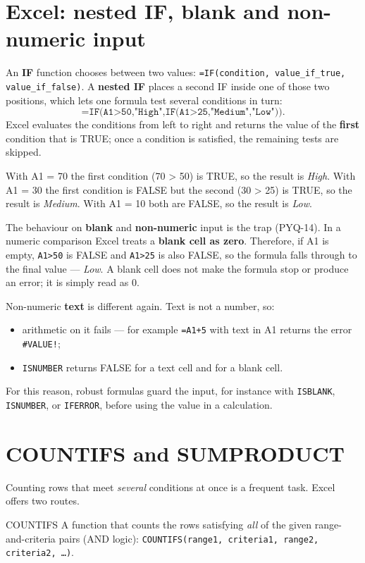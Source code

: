 \section{Excel: nested IF, blank and non-numeric input}
An \textbf{IF} function chooses between two values:
\texttt{=IF(condition, value\_if\_true, value\_if\_false)}. A \textbf{nested
IF} places a second IF inside one of those two positions, which lets one
formula test several conditions in turn:
\[
\texttt{=IF(A1>50,"High",IF(A1>25,"Medium","Low"))}.
\]
Excel evaluates the conditions from left to right and returns the value of the
\textbf{first} condition that is TRUE; once a condition is satisfied, the
remaining tests are skipped.

\begin{example}
With A1 = 70 the first condition (70 > 50) is TRUE, so the result is
\emph{High}. With A1 = 30 the first condition is FALSE but the second
(30 > 25) is TRUE, so the result is \emph{Medium}. With A1 = 10 both are
FALSE, so the result is \emph{Low}.
\end{example}

The behaviour on \textbf{blank} and \textbf{non-numeric} input is the trap
(PYQ-14). In a numeric comparison Excel treats a \textbf{blank cell as zero}.
Therefore, if A1 is empty, \texttt{A1>50} is FALSE and
\texttt{A1>25} is also FALSE, so the formula falls through to the final value
--- \emph{Low}. A blank cell does not make the formula stop or produce an
error; it is simply read as 0.

Non-numeric \textbf{text} is different again. Text is not a number, so:
\begin{itemize}
  \item arithmetic on it fails --- for example \texttt{=A1+5} with text in A1
    returns the error \texttt{\#VALUE!};
  \item \texttt{ISNUMBER} returns FALSE for a text cell and for a blank cell.
\end{itemize}
For this reason, robust formulas guard the input, for instance with
\texttt{ISBLANK}, \texttt{ISNUMBER}, or \texttt{IFERROR}, before using the
value in a calculation.

\section{COUNTIFS and SUMPRODUCT}
Counting rows that meet \emph{several} conditions at once is a frequent task.
Excel offers two routes.

\begin{definitionbox}{COUNTIFS}
A function that counts the rows satisfying \emph{all} of the given
range-and-criteria pairs (AND logic):
\texttt{COUNTIFS(range1, criteria1, range2, criteria2, \ldots)}.
\end{definitionbox}

